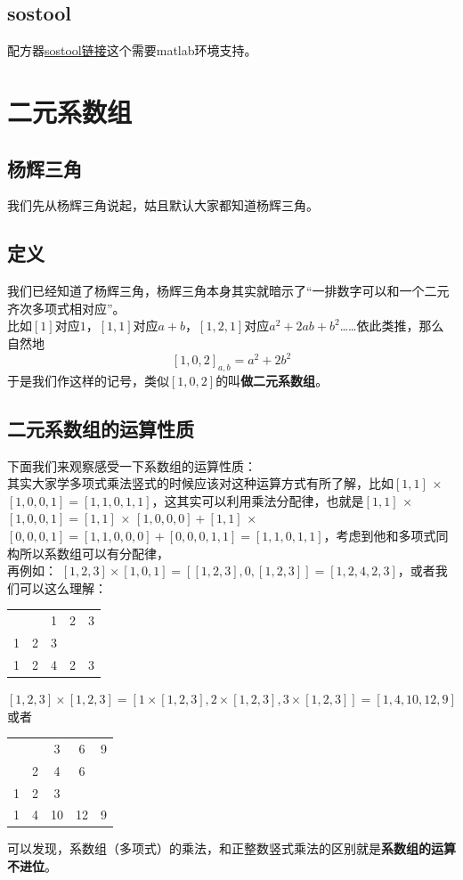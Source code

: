 \documentclass[UTF8]{ctexart}
\begin{document}
\subsection{sostool}
配方器\href{https://www.mit.edu/~parrilo/sostools/}{sostool链接}这个需要matlab环境支持。
\newpage
\section{二元系数组}
\subsection{杨辉三角}
我们先从杨辉三角说起，姑且默认大家都知道杨辉三角。
\subsection{定义}
我们已经知道了杨辉三角，杨辉三角本身其实就暗示了“一排数字可以和一个二元齐次多项式相对应”。\\
比如$ [1] $对应$ 1 $，$ [1,1] $对应$ a+b $，$ [1,2,1] $对应$ a^{2}+2ab+b^{2} $……依此类推，那么自然地
$$[1,0,2]_{a, b}=a^{2}+2 b^{2}$$
于是我们作这样的记号，类似$ [1,0,2] $的叫\textbf{做二元系数组}。
\subsection{二元系数组的运算性质}
下面我们来观察感受一下系数组的运算性质：\\
其实大家学多项式乘法竖式的时候应该对这种运算方式有所了解，比如$ [1,1]$ × $[1,0,0,1]=[1,1,0,1,1] $，这其实可以利用乘法分配律，也就是$ [1,1]$ × $[1,0,0,1]=[1,1]$ × $[1,0,0,0]+[1,1]$ × $[0,0,0,1]=[1,1,0,0,0]+[0,0,0,1,1]=[1,1,0,1,1] $，考虑到他和多项式同构所以系数组可以有分配律，\\
再例如：
$[1,2,3] \times[1,0,1]=[[1,2,3], 0,[1,2,3]]=[1,2,4,2,3]$，或者我们可以这么理解：
\begin{center}
	\begin{tabular}{ccccc}
		&  & 1 & 2 & 3 \\
		1& 2 & 3 &  &  \\
		\hline
		1& 2 & 4 & 2 & 3 \\
	\end{tabular}
\end{center}
$[1,2,3] \times[1,2,3]=[1 \times[1,2,3], 2 \times[1,2,3], 3 \times[1,2,3]]=[1,4,10,12,9]$或者
\begin{center}
	\begin{tabular}{ccccc}
		
		&  & 3 & 6 & 9 \\
		& 2 & 4 & 6 &  \\
		1& 2 & 3 &  &  \\
		\hline
		1& 4 & 10 & 12 & 9 \\
	\end{tabular}
\end{center}
可以发现，系数组（多项式）的乘法，和正整数竖式乘法的区别就是\textbf{系数组的运算不进位}。
\end{document}
